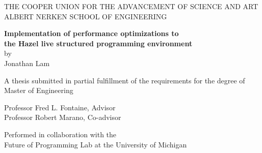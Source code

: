 \thispagestyle{empty}

{
  \centering

  \MakeUppercase{
    The Cooper Union for the Advancement of Science and Art \\
    Albert Nerken School of Engineering \\
  }
  
  \vfill{}
  
  {
    \textbf{
      \Large
      Implementation of performance optimizations to \\
      the Hazel live structured programming environment \\
    }
    \vs{}
    by \\
    Jonathan Lam \\
  }

  \vfill{}

  {
    A thesis submitted in partial fulfillment of the requirements for the degree of \\
    Master of Engineering \\
  }

  \vfill{}

  {
    Professor Fred L. Fontaine, Advisor \\
    Professor Robert Marano, Co-advisor \\
  }


  \vfill{}
  {
    Performed in collaboration with the \\
    Future of Programming Lab at the University of Michigan \\
  }
}

